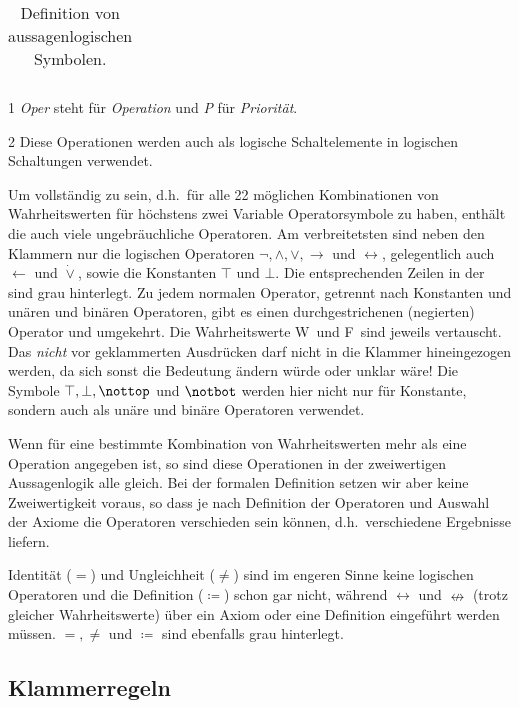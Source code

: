 \documentclass[english,ngerman,parskip=half,headsepline,footsepline]{scrreprt}
\makeatletter
\newcommand*{\texttrue}{W}
\newcommand*{\textfalse}{F}
\newcommand*{\ltrue}{\top}      %
\newcommand*{\lnfalse}{\notbot} %
\newcommand*{\lfalse}{\bot}     %
\newcommand*{\lntrue}{\nottop}  %
\newcommand*{\lleftimp}{\operatorname{\leftarrow}}      %
\newcommand*{\limp}{\operatorname{\rightarrow}}         %
\newcommand*{\lequiv}{\operatorname{\leftrightarrow}}   %
\newcommand*{\lnequiv}{\operatorname{\nleftrightarrow}} %
\newcommand*{\lxor}{\operatorname{\dot{\lor}}}          %
\newcommand*{\defeq}{\coloneqq}
\newcommand*{\textdh}{d.\@ h.\@}
\makeatother
\begin{document}
\begin{table}
\begin{threeparttable}
\begin{tabularx}{\linewidth}{c||c:cc:cccc|X:X|c|}
				\hline %
			\end{tabularx}
			\caption{Definition von aussagenlogischen Symbolen.}
			\label{tab:Symbole}
			\begin{tablenotes}
				\item[1] \emph{Oper} steht für \emph{Operation} und \emph{P} für \emph{Priorität}.
				\item[2] Diese Operationen werden auch als logische Schaltelemente in logischen Schaltungen verwendet.
			\end{tablenotes}
		\end{threeparttable}
	\end{table}

	Um vollständig zu sein, \textdh\ für alle 22 möglichen Kombinationen von Wahrheitswerten für höchstens zwei Variable Operatorsymbole zu haben, enthält die \tablename auch viele ungebräuchliche Operatoren. Am verbreitetsten sind neben den Klammern nur die logischen Operatoren $\lnot, \land, \lor, \limp$ und $\lequiv$, gelegentlich auch $\lleftimp$ und $\lxor$, sowie die Konstanten $\ltrue$ und $\lfalse$. Die entsprechenden Zeilen in der \tablename sind grau hinterlegt. Zu jedem normalen Operator, getrennt nach Konstanten und unären und binären Operatoren, gibt es einen durchgestrichenen (negierten) Operator und umgekehrt. Die Wahrheitswerte \texttrue\ und \textfalse\ sind jeweils vertauscht. Das \emph{nicht} vor geklammerten Ausdrücken darf nicht in die Klammer hineingezogen werden, da sich sonst die Bedeutung ändern würde oder unklar wäre! Die Symbole $\ltrue, \lfalse, \lntrue$ und $\lnfalse$ werden hier nicht nur für Konstante, sondern auch als unäre und binäre Operatoren verwendet.

	Wenn für eine bestimmte Kombination von Wahrheitswerten mehr als eine Operation angegeben ist, so sind diese Operationen in der zweiwertigen Aussagenlogik alle gleich. Bei der formalen Definition setzen wir aber keine Zweiwertigkeit voraus, so dass je nach Definition der Operatoren und Auswahl der Axiome die Operatoren verschieden sein können, \textdh\ verschiedene Ergebnisse liefern.

	Identität ($=$) und Ungleichheit ($\ne$) sind im engeren Sinne keine logischen Operatoren und die Definition ($\defeq$) schon gar nicht, während $\lequiv$ und $\lnequiv$ (trotz gleicher Wahrheitswerte) über ein Axiom oder eine Definition eingeführt werden müssen. $=, \ne$ und $\defeq$ sind ebenfalls grau hinterlegt.

	\subsection{Klammerregeln} %
	\label{sub:Klammerregeln}
\end{document}
